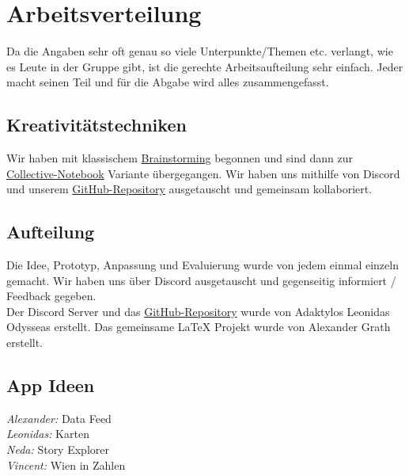 \section{Arbeitsverteilung}
Da die Angaben sehr oft genau so viele Unterpunkte/Themen etc. verlangt, wie es Leute in der Gruppe gibt, ist die gerechte Arbeitsaufteilung sehr einfach.
Jeder macht seinen Teil und für die Abgabe wird alles zusammengefasst.
%
\subsection{ Kreativitätstechniken}
Wir haben mit klassischem \href{https://de.wikipedia.org/wiki/Brainstorming}{Brainstorming} begonnen und sind dann zur \href{https://de.wikipedia.org/wiki/Collective-Notebook}{Collective-Notebook} Variante übergegangen.
Wir haben uns mithilfe von Discord und unserem \href{https://github.com/L-28/hci-2026s}{GitHub-Repository} ausgetauscht und gemeinsam kollaboriert.
%
\subsection{Aufteilung}
Die Idee, Prototyp, Anpassung und Evaluierung wurde von jedem einmal einzeln gemacht. Wir haben uns über Discord ausgetauscht und gegenseitig informiert / Feedback gegeben.\\
Der Discord Server und das \href{https://github.com/L-28/hci-2026s}{GitHub-Repository} wurde von Adaktylos Leonidas Odysseas erstellt. Das gemeinsame LaTeX Projekt wurde von Alexander Grath erstellt.
%
\subsection*{App Ideen}
\emph{Alexander:} Data Feed\\
\emph{Leonidas:} Karten\\
\emph{Neda:} Story Explorer\\
\emph{Vincent:} Wien in Zahlen